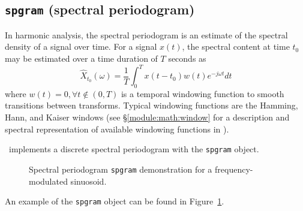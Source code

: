 %

%
%
\subsection{{\tt spgram} (spectral periodogram)}
\label{module:fft:spgram}

In harmonic analysis, the spectral periodogram is an estimate of the
spectral density of a signal over time.
For a signal $x(t)$, the spectral content at time $t_0$ may be estimated
over a time duration of $T$ seconds as
\[
    \hat{X}_{t_0}(\omega) =
        \frac{1}{T} \int_{0}^{T} { x(t-t_0)w(t)e^{-j\omega t} dt }
\]
where $w(t) = 0,\forall t \notin (0,T)$
is a temporal windowing function to smooth transitions
between transforms.
Typical windowing functions are the Hamming, Hann, and Kaiser windows
(see \S\ref{module:math:window} for a description and spectral
representation of available windowing functions in \liquid).

\liquid\ implements a discrete spectral periodogram with the
{\tt spgram} object.
%
\begin{figure}
\centering
{}
\caption{Spectral periodogram {\tt spgram} demonstration for a frequency-modulated sinuosoid.}
\label{fig:module:fft:spgram}
\end{figure}
%
An example of the {\tt spgram} object can be
found in Figure~\ref{fig:module:fft:spgram}.

